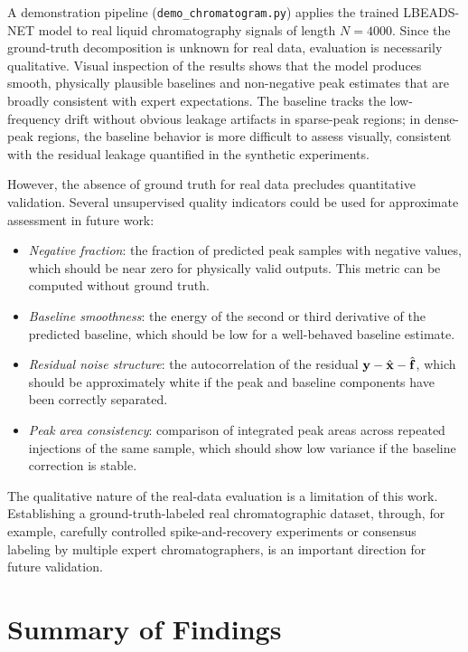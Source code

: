 A demonstration pipeline (\texttt{demo\_chromatogram.py}) applies the trained LBEADS-NET model to real liquid chromatography signals of length $N = 4000$. Since the ground-truth decomposition is unknown for real data, evaluation is necessarily qualitative. Visual inspection of the results shows that the model produces smooth, physically plausible baselines and non-negative peak estimates that are broadly consistent with expert expectations. The baseline tracks the low-frequency drift without obvious leakage artifacts in sparse-peak regions; in dense-peak regions, the baseline behavior is more difficult to assess visually, consistent with the residual leakage quantified in the synthetic experiments.

However, the absence of ground truth for real data precludes quantitative validation. Several unsupervised quality indicators could be used for approximate assessment in future work:
\begin{itemize}
    \item \emph{Negative fraction}: the fraction of predicted peak samples with negative values, which should be near zero for physically valid outputs. This metric can be computed without ground truth.
    \item \emph{Baseline smoothness}: the energy of the second or third derivative of the predicted baseline, which should be low for a well-behaved baseline estimate.
    \item \emph{Residual noise structure}: the autocorrelation of the residual $\mathbf{y} - \hat{\mathbf{x}} - \hat{\mathbf{f}}$, which should be approximately white if the peak and baseline components have been correctly separated.
    \item \emph{Peak area consistency}: comparison of integrated peak areas across repeated injections of the same sample, which should show low variance if the baseline correction is stable.
\end{itemize}

The qualitative nature of the real-data evaluation is a limitation of this work. Establishing a ground-truth-labeled real chromatographic dataset, through, for example, carefully controlled spike-and-recovery experiments or consensus labeling by multiple expert chromatographers, is an important direction for future validation.


\section{Summary of Findings}
\label{sec:results_summary}

